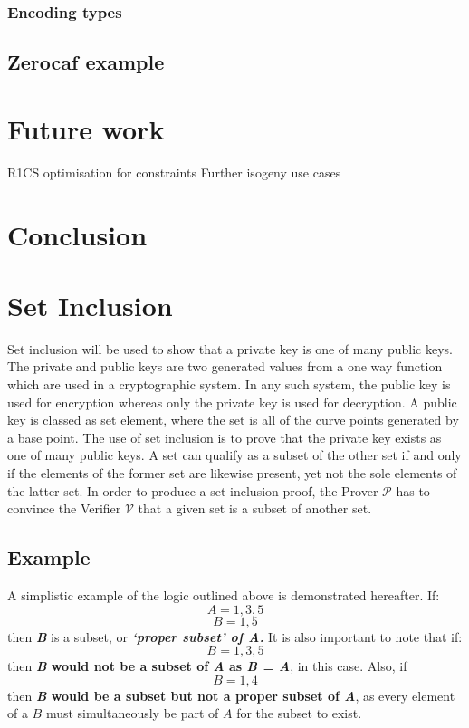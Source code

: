 \documentclass{article}
\begin{document}
\subsubsection{Encoding types}
\subsection{Zerocaf example}


\section{Future work}
R1CS optimisation for constraints 
Further isogeny use cases 

\section{Conclusion}
 
\section{Set Inclusion}
Set inclusion will be used to show that a private key is one of many public keys. The private and public keys are two generated values from a one way function which are used in a cryptographic system. In any such system, the public key is used for encryption whereas only the private key is used for decryption. A public key is classed as set element, where the set is all of the curve points generated by a base point. The use of set inclusion is to prove that the private key exists as one of many public keys. A set can qualify as a subset of the other set if and only if the elements of the former set are likewise present, yet not the sole elements of the latter set. In order to produce a set inclusion proof, the Prover $\mathcal{P}$ has to convince the Verifier $\mathcal{V}$ that a given set is a subset of another set.
\subsection{Example}
A simplistic example of the logic outlined above is demonstrated hereafter. If:  $$ A={1,3,5} $$
$$ B={1,5} $$ then \textbf{\textit{B}} is a subset, or \textbf{\textit{‘proper subset’ of A.}} 
It is also important to note that if: $$ B={1,3,5} $$ then \textbf{\textit{B} would not be a subset of \textit{A} as \textit{B = A}}, in this case. Also, if $$ B={1,4} $$ then \textbf{\textit{B} would be a subset but not a proper subset of \textit{A}}, as every element of a $B$ must simultaneously be part of $A$ for the subset to exist.
\end{document}
